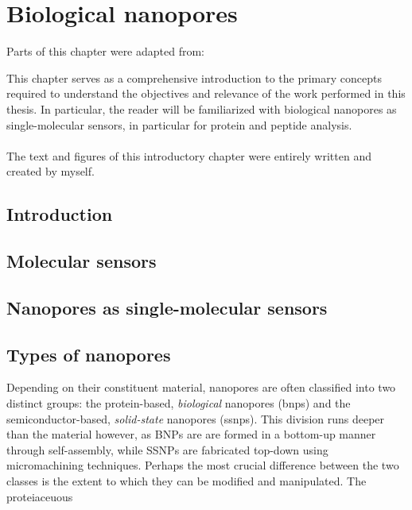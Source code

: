 \chapter{Biological nanopores}\label{ch:nanopores}


\begin{shaded}
Parts of this chapter were adapted from:\\
\newpage
\end{shaded}

This chapter serves as a comprehensive introduction to the primary concepts required to understand the
objectives and relevance of the work performed in this thesis. In particular, the reader will be familiarized
with biological nanopores as single-molecular sensors, in particular for protein and peptide analysis.
\\
\\
The text and figures of this introductory chapter were entirely written and created by myself.

\newpage

%
%
\section{Introduction}


%
%
\section{Molecular sensors}


%
%
\section{Nanopores as single-molecular sensors}



%
%
\section{Types of nanopores}


Depending on their constituent material, nanopores are often classified into two distinct groups: the protein-based, \emph{biological} nanopores (\glspl{bnp}) and the semiconductor-based, \emph{solid-state} nanopores (\glspl{ssnp}).\cite{Dekker-2007} This division runs deeper than the material however, as BNPs are are formed in a bottom-up manner through self-assembly, while SSNPs are fabricated top-down using micromachining techniques. Perhaps the most crucial difference between the two classes is the extent to which they can be modified and manipulated. The proteiaceuous

